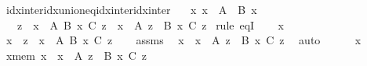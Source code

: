 \begin{isabellebody}
\endisatagproof
{\isafoldproof}%
%
\isadelimproof
\isanewline
%
\endisadelimproof
\isanewline
{}\isamarkupfalse%
\ idx{\isacharunderscore}{\kern0pt}inter{\isacharunderscore}{\kern0pt}idx{\isacharunderscore}{\kern0pt}union{\isacharunderscore}{\kern0pt}eq{\isacharunderscore}{\kern0pt}idx{\isacharunderscore}{\kern0pt}inter{\isacharunderscore}{\kern0pt}idx{\isacharunderscore}{\kern0pt}inter{\isacharcolon}{\kern0pt}\isanewline
\ \ \ {\isachardoublequoteopen}{\isasymAnd}x{\isachardot}{\kern0pt}\ {\isacharparenleft}{\kern0pt}x\ {\isasymin}\ A\ {\isasymLongrightarrow}\ B\ x\ {\isasymnoteq}\ {\isacharbraceleft}{\kern0pt}{\isacharbraceright}{\kern0pt}{\isacharparenright}{\kern0pt}{\isachardoublequoteclose}\isanewline
\ \ \ {\isachardoublequoteopen}{\isacharparenleft}{\kern0pt}{\isasymInter}z\ {\isasymin}\ {\isacharparenleft}{\kern0pt}{\isasymUnion}x\ {\isasymin}\ A{\isachardot}{\kern0pt}\ B\ x{\isacharparenright}{\kern0pt}{\isachardot}{\kern0pt}\ C\ z{\isacharparenright}{\kern0pt}\ {\isacharequal}{\kern0pt}\ {\isacharparenleft}{\kern0pt}{\isasymInter}x\ {\isasymin}\ A{\isachardot}{\kern0pt}\ {\isasymInter}z\ {\isasymin}\ B\ x{\isachardot}{\kern0pt}\ C\ z{\isacharparenright}{\kern0pt}{\isachardoublequoteclose}\isanewline
%
\isadelimproof
%
\endisadelimproof
%
\isatagproof
{}\isamarkupfalse%
\ {\isacharparenleft}{\kern0pt}rule\ eqI{\isacharparenright}{\kern0pt}\isanewline
\ \ \isamarkupfalse%
\ x\ \isamarkupfalse%
\ {\isachardoublequoteopen}x\ {\isasymin}\ {\isacharparenleft}{\kern0pt}{\isasymInter}z\ {\isasymin}\ {\isacharparenleft}{\kern0pt}{\isasymUnion}x\ {\isasymin}\ A{\isachardot}{\kern0pt}\ B\ x{\isacharparenright}{\kern0pt}{\isachardot}{\kern0pt}\ C\ z{\isacharparenright}{\kern0pt}{\isachardoublequoteclose}\isanewline
\ \ \isamarkupfalse%
\ assms\ \isamarkupfalse%
\ {\isachardoublequoteopen}x\ {\isasymin}\ {\isacharparenleft}{\kern0pt}{\isasymInter}x\ {\isasymin}\ A{\isachardot}{\kern0pt}\ {\isasymInter}z\ {\isasymin}\ B\ x{\isachardot}{\kern0pt}\ C\ z{\isacharparenright}{\kern0pt}{\isachardoublequoteclose}\ \isamarkupfalse%
\ {\isacharparenleft}{\kern0pt}auto\ {}\ {}{\isacharparenright}{\kern0pt}\isanewline
{}\isamarkupfalse%
\isanewline
\ \ \isamarkupfalse%
\ x\ \isamarkupfalse%
\ x{\isacharunderscore}{\kern0pt}mem{\isacharcolon}{\kern0pt}\ {\isachardoublequoteopen}x\ {\isasymin}\ {\isacharparenleft}{\kern0pt}{\isasymInter}x\ {\isasymin}\ A{\isachardot}{\kern0pt}\ {\isasymInter}z\ {\isasymin}\ B\ x{\isachardot}{\kern0pt}\ C\ z{\isacharparenright}{\kern0pt}{\isachardoublequoteclose}\isanewline

\end{isabellebody}
